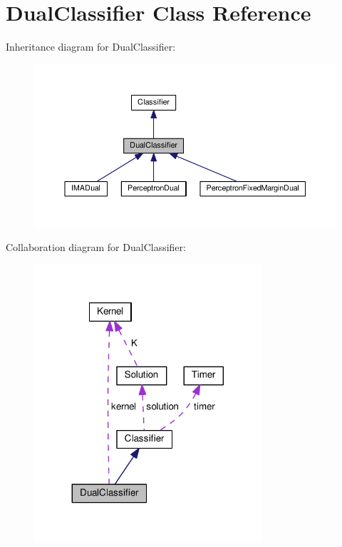 \hypertarget{class_dual_classifier}{}\section{Dual\+Classifier Class Reference}
\label{class_dual_classifier}


Inheritance diagram for Dual\+Classifier\+:
\nopagebreak
\begin{figure}[H]
\begin{center}
\leavevmode
\includegraphics[width=350pt]{class_dual_classifier__inherit__graph}
\end{center}
\end{figure}


Collaboration diagram for Dual\+Classifier\+:
\nopagebreak
\begin{figure}[H]
\begin{center}
\leavevmode
\includegraphics[width=239pt]{class_dual_classifier__coll__graph}
\end{center}
\end{figure}
